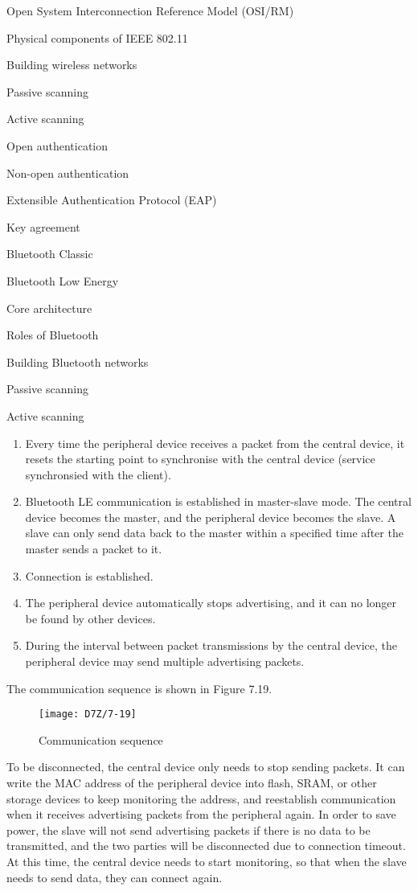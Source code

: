 \documentclass[a4paper,12pt]{book}
\begin{document}
\begin{term}{Open System Interconnection Reference Model (OSI/RM)}
\begin{term}{Physical components of IEEE 802.11}
\begin{term}{Building wireless networks}
\begin{term}{Passive scanning}
\begin{term}{Active scanning}
\begin{term}{Open authentication}
\begin{term}{Non-open authentication}
\begin{term}{Extensible Authentication Protocol (EAP)}
\begin{term}{Key agreement}
\begin{term}{Bluetooth Classic}
\begin{term}{Bluetooth Low Energy}
\begin{term}{Core architecture}
\begin{term}{Roles of Bluetooth}
\begin{term}{Building Bluetooth networks}
\begin{term}{Passive scanning}
\begin{term}{Active scanning}
\begin{enumerate}[label=(\arabic*)]
    \begin{enumerate}[label=\alph*., leftmargin=1.5em]
        \item Every time the peripheral device receives a packet from the central device, it resets the starting point to synchronise with the central device (service synchronsied with the client).
        \item Bluetooth LE communication is established in master-slave mode. The central device becomes the master, and the peripheral device becomes the slave. A slave can only send data back to the master within a specified time after the master sends a packet to it.
        \item Connection is established.
        \item The peripheral device automatically stops advertising, and it can no longer be found by other devices.
        \item During the interval between packet transmissions by the central device, the peripheral device may send multiple advertising packets.
    \end{enumerate}

    The communication sequence is shown in Figure 7.19.

    \begin{figure}[!h]
        \centering
        \texttt{[image: D7Z/7-19]}
        \caption{Communication sequence}
    \end{figure}
\end{enumerate}

To be disconnected, the central device only needs to stop sending packets. It can write the MAC address of the peripheral device into flash, SRAM, or other storage devices to keep monitoring the address, and reestablish communication when it receives advertising packets from the peripheral again. In order to save power, the slave will not send advertising packets if there is no data to be transmitted, and the two parties will be disconnected due to connection timeout. At this time, the central device needs to start monitoring, so that when the slave needs to send data, they can connect again.


\end{term}
\end{term}
\end{term}
\end{term}
\end{term}
\end{term}
\end{term}
\end{term}
\end{term}
\end{term}
\end{term}
\end{term}
\end{term}
\end{term}
\end{term}
\end{term}
\end{document}
